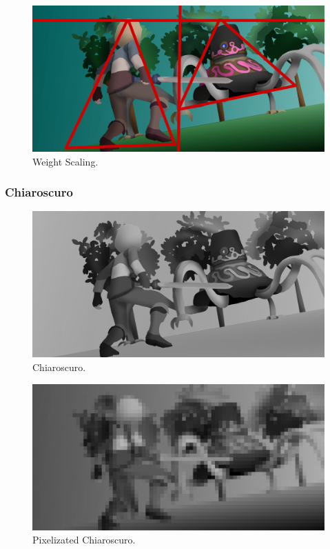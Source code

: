 \documentclass{cup-pan}
\begin{document}
            \begin{figure}[H]
                \includegraphics[width=\textwidth]{Imagenes/Fanart2/Analysis/balanza.png}
                \caption{Weight Scaling.}
            \end{figure}

        \subsubsection{Chiaroscuro}

            \begin{figure}[H]
                \includegraphics[width=\textwidth]{Imagenes/Fanart2/Analysis/claroscuro.png}
                \caption{Chiaroscuro.}
            \end{figure}

            \begin{figure}[H]
                \includegraphics[width=\textwidth]{Imagenes/Fanart2/Analysis/pixel.png}
                \caption{Pixelizated Chiaroscuro.}
            \end{figure}
\end{document}
